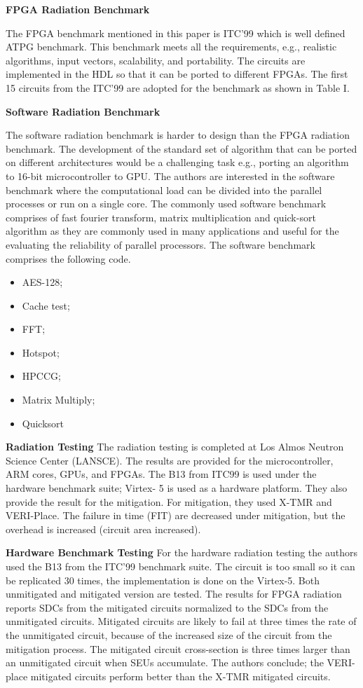 \textbf{FPGA Radiation Benchmark}

The FPGA benchmark mentioned in this paper is ITC'99 which is well defined ATPG benchmark. This benchmark meets all the requirements, e.g., realistic algorithms, input vectors, scalability, and portability. The circuits are implemented in the HDL so that it can be ported to different FPGAs. The first 15 circuits from the ITC'99 are adopted for the benchmark as shown in Table I.

\textbf{Software Radiation Benchmark}

The software radiation benchmark is harder to design than the FPGA radiation benchmark. The development of the standard set of algorithm that can be ported on different architectures would be a challenging task e.g., porting an algorithm to 16-bit microcontroller to GPU. The authors are interested in the software benchmark where the computational load can be divided into the parallel processes or run on a single core. The commonly used software benchmark comprises of fast fourier transform, matrix multiplication and quick-sort algorithm as they are commonly used in many applications and useful for the evaluating the reliability of parallel processors. The software benchmark comprises the following code.

\begin{itemize}
\item AES-128;
\item Cache test;
\item FFT;
\item Hotspot;
\item HPCCG;
\item Matrix Multiply;
\item Quicksort
\end{itemize}





\textbf{Radiation Testing}
The radiation testing is completed at Los Almos Neutron Science Center (LANSCE). The results are provided for the microcontroller, ARM cores, GPUs, and FPGAs. The B13 from ITC99 is used under the hardware benchmark suite; Virtex- 5 is used as a hardware platform. They also provide the result for the mitigation. For mitigation, they used X-TMR and VERI-Place. The failure in time (FIT) are decreased under mitigation, but the overhead is increased (circuit area increased).

\textbf{Hardware Benchmark Testing}
For the hardware radiation testing the authors used the B13 from the ITC’99 benchmark suite. The circuit is too small so it can be replicated 30 times, the implementation is done on the Virtex-5. Both unmitigated and mitigated version are tested. The results for FPGA radiation reports SDCs from the mitigated circuits normalized to the SDCs from the unmitigated circuits. Mitigated circuits are likely to fail at three times the rate of the unmitigated circuit, because of the increased size of the circuit from the mitigation process. The mitigated circuit cross-section is three times larger than an unmitigated circuit when SEUs accumulate. The authors conclude; the VERI-place mitigated circuits perform better than the X-TMR mitigated circuits.

